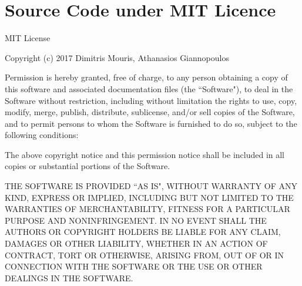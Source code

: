 \chapter{Source Code under MIT Licence}\label{AppendixA}

MIT License
\medskip

Copyright (c) 2017 Dimitris Mouris, Athanasios Giannopoulos
\medskip

Permission is hereby granted, free of charge, to any person obtaining a copy of this software and associated documentation files (the ``Software"), to deal in the Software without restriction, including without limitation the rights to use, copy, modify, merge, publish, distribute, sublicense, and/or sell copies of the Software, and to permit persons to whom the Software is furnished to do so, subject to the following conditions:
\medskip

The above copyright notice and this permission notice shall be included in all copies or substantial portions of the Software.\par
\medskip

THE SOFTWARE IS PROVIDED ``AS IS", WITHOUT WARRANTY OF ANY KIND, EXPRESS OR IMPLIED, INCLUDING BUT NOT LIMITED TO THE WARRANTIES OF MERCHANTABILITY, FITNESS FOR A PARTICULAR PURPOSE AND NONINFRINGEMENT.
IN NO EVENT SHALL THE AUTHORS OR COPYRIGHT HOLDERS BE LIABLE FOR ANY CLAIM, DAMAGES OR OTHER LIABILITY, WHETHER IN AN ACTION OF CONTRACT, TORT OR OTHERWISE, ARISING FROM, OUT OF OR IN CONNECTION WITH THE SOFTWARE OR THE USE OR OTHER DEALINGS IN THE SOFTWARE.
